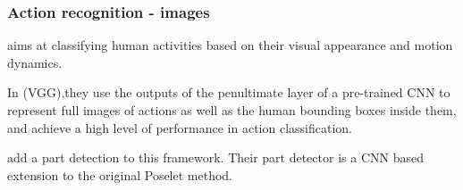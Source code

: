 \begin{frame}
\frametitle{Action recognition - images}


 aims at classifying human activities based on their visual appearance and motion dynamics.

\bigskip 

In \cite{simonyan2014very} (VGG),they use the outputs of the penultimate layer of a pre-trained CNN to represent full images of actions as well as the human bounding boxes inside them, and achieve a high level of performance in action classification.

\bigskip 

 \cite{gkioxari2015actions} add a part detection to this framework. Their part detector is a CNN based extension to the original Poselet \cite{pishchulin2013poselet} method.

\end{frame}


